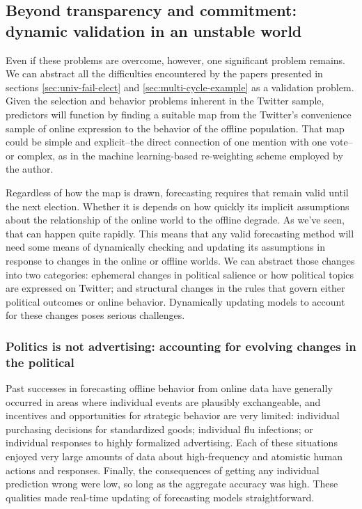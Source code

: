 \documentclass{article}
\begin{document}
\subsection{Beyond transparency and commitment: dynamic validation in
  an unstable world}
\label{sec:dynamic-validation}

Even if these problems are overcome, however, one significant problem
remains. We can abstract all the difficulties encountered by the
papers presented in sections \ref{sec:univ-fail-elect} and
\ref{sec:multi-cycle-example} as a validation problem. Given the
selection and behavior problems inherent in the Twitter sample,
predictors will function by finding a suitable map from the Twitter's
convenience sample of online expression to the behavior of the offline
population. That map could be simple and explicit--the direct
connection of one mention with one vote--or complex, as in the machine
learning-based re-weighting scheme employed by the author.

Regardless of how the map is drawn, forecasting requires that remain
valid until the next election. Whether it is depends on how quickly
its implicit assumptions about the relationship of the online world to
the offline degrade. As we've seen, that can happen quite
rapidly. This means that any valid forecasting method will need some
means of dynamically checking and updating its assumptions in response
to changes in the online or offline worlds. We can abstract those
changes into two categories: ephemeral changes in political salience
or how political topics are expressed on Twitter; and structural
changes in the rules that govern either political outcomes or online
behavior. Dynamically updating models to account for these changes
poses serious challenges.

\subsubsection{Politics is not advertising: accounting for evolving changes in the political}
\label{sec:acco-evolv-chang}

Past successes in forecasting offline behavior from online data have
generally occurred in areas where individual events are plausibly
exchangeable, and incentives and opportunities for strategic behavior
are very limited: individual purchasing decisions for standardized
goods; individual flu infections; or individual responses to highly
formalized advertising. Each of these situations enjoyed very large
amounts of data about high-frequency and atomistic human actions and
responses. Finally, the consequences of getting any individual
prediction wrong were low, so long as the aggregate accuracy was
high. These qualities made real-time updating of forecasting
models straightforward.
\end{document}
